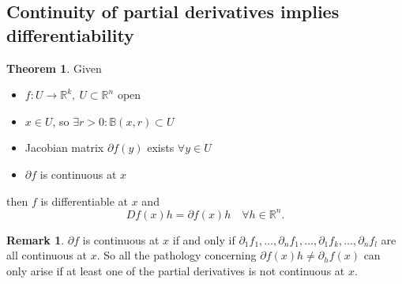 \documentclass[a4paper]{article}
\theoremstyle{definition}
\newtheorem{thm}[defn]{Theorem}
\newtheorem*{remark}{Remark}
\begin{document}
\subsection{Continuity of partial derivatives implies differentiability}
\begin{thm}
Given \begin{itemize}
    \item $f:U\rightarrow \mathbb R^k,\ U\subset \mathbb R^n$ open
    \item $x\in U$, so $\exists r>0: \mathbb B(x,r) \subset U$
    \item Jacobian matrix $\partial f(y)$ exists $\forall y\in U$
    \item $\partial f$ is continuous at $x$
\end{itemize}
then $f$ is differentiable at $x$ and
\[
Df(x)h=\partial f(x)h \quad \forall h\in \mathbb R^n .
\]
\end{thm}
\begin{remark}
$\partial f$ is continuous at $x$ if and only if $\partial_1 f_1,\ldots,\partial_n f_1,\ldots,\partial_1f_k,\ldots,\partial_n f_l$ are all continuous at $x$. So all the pathology concerning $\partial f(x)h \neq \partial_h f(x)$ can only arise if at least one of the partial derivatives is not continuous at $x$.
\end{remark}
\end{document}
